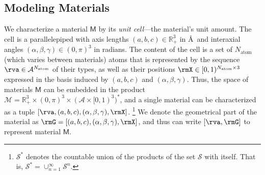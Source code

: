 \documentclass{article}
\theoremstyle{plain}
\theoremstyle{definition}
\theoremstyle{remark}
\begin{document}
\subsection{Modeling Materials}
We characterize a material  $\mathsf{M}$ by its \emph{unit cell}---the material's unit amount. 
The cell is a parallelepiped with axis lengths $(a, b, c)\in\mathbb{R}_{+}^{3}$ in \AA\ and interaxial angles $(\alpha, \beta, \gamma)\in(0, \pi)^3$ in radians.
The content of the cell is a set of $N_{\text{atom}}$ (which varies between materials) atoms that is represented by the sequence $\rva\in\mathcal{A}^{N_{\text{atom}}}$ of their types, as well as their positions $\rmX\in [0, 1)^{N_{\text{atom}}\times 3}$ expressed in the basis induced by $(a, b, c)$ and $(\alpha, \beta, \gamma)$.
Thus, the space of materials $\mathsf{M}$ can be embedded in the product $\mathcal{M}=\mathbb{R}_{+}^{3}\times(0, \pi)^{3}\times(\mathcal{A}\times [0,1)^{3})^{*}$, and a single material can be characterized as a tuple $[\rva, (a,b,c), (\alpha, \beta, \gamma), \rmX]$.
\footnote{$\mathcal{S}^{*}$ denotes the countable union of the products of the set $\mathcal{S}$ with itself. That is, $\mathcal{S}^{*}=\cup_{n=1}^{\infty}\mathcal{S}^{n}$.}
We denote the geometrical part of the material as $\rmG=[(a,b,c), (\alpha, \beta, \gamma), \rmX]$, and thus can write $[\rva, \rmG]$ to represent material $\mathsf{M}$.
\end{document}
